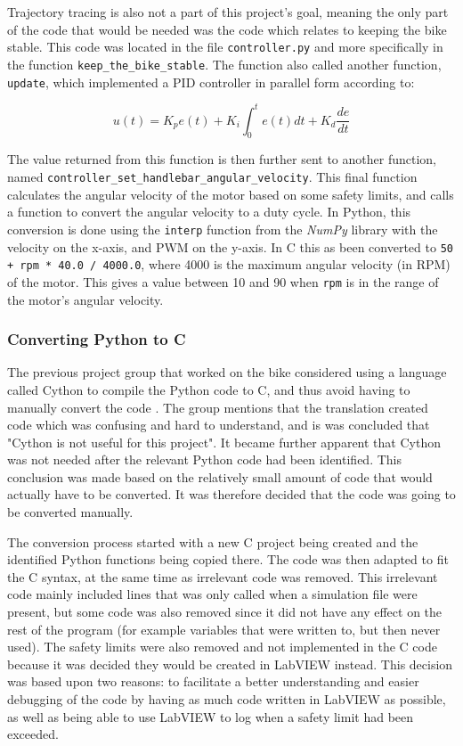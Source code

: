 Trajectory tracing is also not a part of this project's goal, meaning the only part of the code that would be needed was the code which relates to keeping the bike stable. This code was located in the file \texttt{controller.py} and more specifically in the function \texttt{keep\_the\_bike\_stable}. The function also called another function, \texttt{update}, which implemented a PID controller in parallel form according to:

\begin{equation*}
    u(t) = K_p e(t) + K_i \int_{0}^{t} e(t)dt + K_d \frac{de}{dt}
\end{equation*}

The value returned from this function is then further sent to another function, named \texttt{controller\_set\_handlebar\_angular\_velocity}. This final function calculates the angular velocity of the motor based on some safety limits, and calls a function to convert the angular velocity to a duty cycle. In Python, this conversion is done using the \texttt{interp} function from the \textit{NumPy} library with the velocity on the x-axis, and PWM on the y-axis. In C this as been converted to \texttt{50 + rpm * 40.0 / 4000.0}, where 4000 is the maximum angular velocity (in RPM) of the motor. This gives a value between 10 and 90 when \texttt{rpm} is in the range of the motor's angular velocity.

\subsubsection{Converting Python to C}

The previous project group that worked on the bike considered using a language called Cython to compile the Python code to C, and thus avoid having to manually convert the code \cite{AronssonKarlsson2022PROJECTAUTOBIKE}. The group mentions that the translation created code which was confusing and hard to understand, and is was concluded that "Cython is not useful for this project". It became further apparent that Cython was not needed after the relevant Python code had been identified. This conclusion was made based on the relatively small amount of code that would actually have to be converted. It was therefore decided that the code was going to be converted manually.

The conversion process started with a new C project being created and the identified Python functions being copied there. The code was then adapted to fit the C syntax, at the same time as irrelevant code was removed. This irrelevant code mainly included lines that was only called when a simulation file were present, but some code was also removed since it did not have any effect on the rest of the program (for example variables that were written to, but then never used). The safety limits were also removed and not implemented in the C code because it was decided they would be created in LabVIEW instead. This decision was based upon two reasons: to facilitate a better understanding and easier debugging of the code by having as much code written in LabVIEW as possible, as well as being able to use LabVIEW to log when a safety limit had been exceeded.

